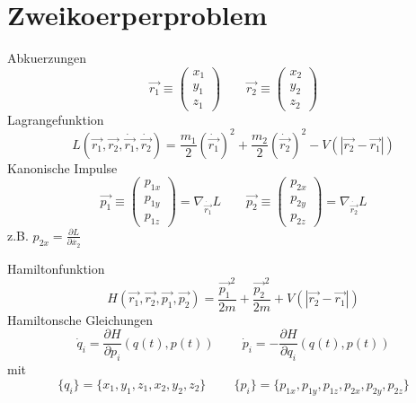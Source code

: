\documentclass[11pt]{article} %
\begin{document}
\setlength{\parindent}{0ex}


\section{Zweikoerperproblem}

Abkuerzungen
\begin{equation}
\vec{r_1} \equiv \begin{pmatrix} x_1 \\ y_1 \\ z_1 \end{pmatrix}  \quad \quad 
\vec{r_2} \equiv \begin{pmatrix} x_2 \\ y_2 \\ z_2 \end{pmatrix}
\end{equation}
Lagrangefunktion
\begin{equation}
L(\vec{r_1},\vec{r_2},\dot{\vec{r_1}},\dot{\vec{r_2}}) = 
\frac{m_1}{2}(\dot{\vec{r_1}})^2 +  \frac{m_2}{2}(\dot{\vec{r_2}})^2
- V(\left| \vec{r_2} - \vec{r_1} \right|)
\end{equation}
Kanonische Impulse
\begin{equation} 
\vec{p_1} \equiv  \begin{pmatrix} p_{1x} \\ p_{1y} \\ p_{1z} \end{pmatrix} = \nabla _{\dot{\vec{r_1}}} L  \quad \quad
\vec{p_2} \equiv  \begin{pmatrix} p_{2x} \\ p_{2y} \\ p_{2z} \end{pmatrix} = \nabla _{\dot{\vec{r_2}}} L 
\end{equation}
\centering
z.B.  $ p_{2x} = \frac{\partial L}{\partial \dot{x_2}} $
\par 
\raggedright
Hamiltonfunktion
\begin{equation}
H(\vec{r_1},\vec{r_2},\vec{p_1},\vec{p_2}) = 
\frac{\vec{p_1}^2}{2m} +  \frac{\vec{p_2}^2}{2m}
+ V(\left| \vec{r_2} - \vec{r_1} \right|)
\end{equation}
Hamiltonsche Gleichungen
\begin{equation} 
\dot{q}_{i}= \frac{\partial H}{\partial p_{i}}(q(t),p(t))\ \quad \quad 
\dot{p}_{i}=-\frac{\partial H}{\partial q_{i}}(q(t),p(t)) 
\end{equation} 
mit
\begin{equation} \{q_i\} = \{ x_1, y_1, z_1, x_2, y_2, z_2 \} \  \quad \quad \{p_i\} = \{ p_{1x}, p_{1y}, p_{1z}, p_{2x}, p_{2y}, p_{2z} \} \end{equation}
\end{document}
